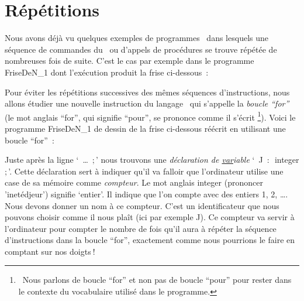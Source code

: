 \section{Répétitions} 

Nous avons déjà vu quelques exemples de programmes \pascal\ dans lesquels une 
séquence de commandes du \robot\ ou d'appels de procédures se trouve répétée de 
nombreuses fois de suite. C'est le cas par exemple dans le programme {\idt FriseDeN\_1} 
dont l'exécution produit la frise ci-dessous~:

\vspace*{8mm}%
\noindent{}
\vspace*{-1cm}%

 
Pour éviter les répétitions successives des mêmes séquences d'ins\-truc\-tions,
nous allons étudier une nouvelle instruction du langage \pascal\ qui s'appelle la 
{\em boucle ``for''} (le mot anglais ``for'', qui signifie ``pour'', 
se prononce comme il s'écrit%
\footnote{\ Nous parlons de boucle ``for'' et non pas de boucle ``pour'' pour rester dans le
contexte du vocabulaire utilisé dans le programme.}). Voici le 
programme {\idt FriseDeN\_1} de dessin de la frise ci-dessous
réécrit en utilisant une boucle ``for''~:

\vspace*{8mm}%
\noindent{}
\vspace*{-1cm}%
\label{prog:FriseDeN_2}


\noindent Juste après la ligne `{\ \ldots\ $;$}' nous trouvons une {\em déclaration de 
\underline{var}\-ia\-ble}
`{\ J\ $:$\ integer$;$}'. Cette déclaration sert à indiquer qu'il va falloir que l'ordinateur utilise 
une case de sa mémoire comme {\em compteur}. Le mot anglais {\idt  integer} (prononcer 'inetédjeur')
signifie `entier'. Il indique que l'on compte avec des entiers 1, 2, \ldots. 
Nous devons donner un nom à ce compteur. C'est un identificateur que nous pouvons choisir 
comme il nous plaît (ici par exemple {\idt  J}). 
Ce compteur va servir à l'ordinateur pour compter le nombre de 
fois qu'il aura à répéter la séquence d'instructions dans la boucle ``for'', exactement comme nous pourrions le 
faire en comptant sur nos  doigts$\:$!

